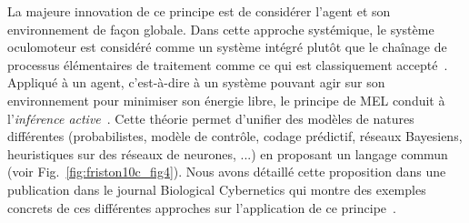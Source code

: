 \documentclass[11pt,french,a4paper,oneside]{article}%
\begin{document}
La majeure innovation de ce principe est de considérer l'agent et son environnement de façon globale. Dans cette approche systémique, le système oculomoteur est considéré comme un système intégré plutôt que le chaînage de processus élémentaires de traitement comme ce qui est classiquement accepté~\citep{Robinson86,Krauzlis89}. Appliqué à un agent, c'est-à-dire à un système pouvant agir sur son environnement pour minimiser son énergie libre, le principe de MEL conduit à l'\emph{inférence active}~\citep{Friston09c}. Cette théorie permet d'unifier des modèles de natures différentes (probabilistes, modèle de contrôle, codage prédictif, réseaux Bayesiens, heuristiques sur des réseaux de neurones, ...) en proposant un langage commun~\citep{Friston10c} (voir Fig.~\ref{fig:friston10c_fig4}). Nous avons détaillé cette proposition dans une publication dans le journal Biological Cybernetics qui montre des exemples concrets de ces différentes approches sur l'application de ce principe~\citep{PerrinetAdamsFriston14}. %
\end{document}
